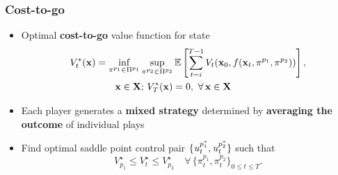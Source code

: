 
\begin{frame}
\frametitle{Cost-to-go}
%
\begin{itemize}
	\item Optimal \textbf{cost-to-go} value function for state %
	\begin{align}
	V_t^*(\textbf{x}) & = \inf_{\pi^{p_1} \in \Pi^{p_1}} \sup_{\pi^{p_2} \in \Pi^{p_2}} \mathbb{E}\left[\sum_{t=i}^{T-1} V_t(\textbf{x}_0, f(\textbf{x}_t, \pi^{p_1}, \pi^{p_2})) \right], \nonumber \\
	&	\qquad  \textbf{x} \in \textbf{X}; \, V_T^*(\textbf{x}) = 0, \, \, \forall \, \textbf{x} \in \textbf{X}\nonumber
	\end{align}
	\item Each player %
	generates a \textbf{mixed strategy} determined by \textbf{averaging the outcome} of individual plays
	\item  Find optimal saddle point control pair $\{\text{\textit{u}}^{p^*_1}_t, \text{\textit{u}}^{p^*_2}_t\}$ %
such that
\[
V^\star_{p_1} \le V_t^\star \le V^\star_{p_2} \quad \forall \,  \{\pi^{p_1}_t, \pi^{p_2}_t\}_{0 \le t\le T}.
\]
\end{itemize}
\end{frame}

